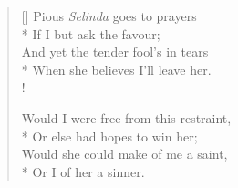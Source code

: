 \documentclass[MAIN]{subfiles}
\begin{document}
\settowidth{\versewidth}{And yet the tender fool's in tears}
\begin{verse}[\versewidth]
Pious \emph{Selinda} goes to prayers\\*
\vin If I but ask the favour;\\
And yet the tender fool's in tears\\*
\vin When she believes I'll leave her.\\!

Would I were free from this restraint,\\*
\vin Or else had hopes to win her;\\
Would she could make of me a saint,\\*
\vin Or I of her a sinner.
\end{verse}
\end{document}
